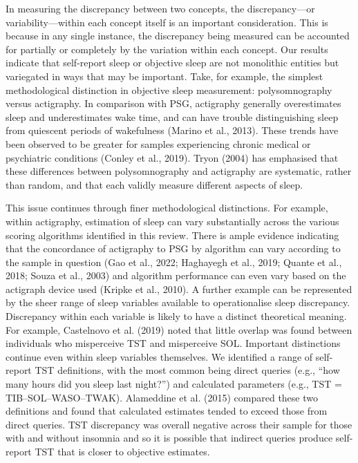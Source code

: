 \documentclass[
]{article}
\begin{document}
In measuring the discrepancy between two concepts, the discrepancy---or variability---within each concept itself is an important consideration. This is because in any single instance, the discrepancy being measured can be accounted for partially or completely by the variation within each concept. Our results indicate that self-report sleep or objective sleep are not monolithic entities but variegated in ways that may be important. Take, for example, the simplest methodological distinction in objective sleep measurement: polysomnography versus actigraphy. In comparison with PSG, actigraphy generally overestimates sleep and underestimates wake time, and can have trouble distinguishing sleep from quiescent periods of wakefulness (Marino et al., 2013). These trends have been observed to be greater for samples experiencing chronic medical or psychiatric conditions (Conley et al., 2019). Tryon (2004) has emphasised that these differences between polysomnography and actigraphy are systematic, rather than random, and that each validly measure different aspects of sleep.

This issue continues through finer methodological distinctions. For example, within actigraphy, estimation of sleep can vary substantially across the various scoring algorithms identified in this review. There is ample evidence indicating that the concordance of actigraphy to PSG by algorithm can vary according to the sample in question (Gao et al., 2022; Haghayegh et al., 2019; Quante et al., 2018; Souza et al., 2003) and algorithm performance can even vary based on the actigraph device used (Kripke et al., 2010). A further example can be represented by the sheer range of sleep variables available to operationalise sleep discrepancy. Discrepancy within each variable is likely to have a distinct theoretical meaning. For example, Castelnovo et al. (2019) noted that little overlap was found between individuals who misperceive TST and misperceive SOL. Important distinctions continue even within sleep variables themselves. We identified a range of self-report TST definitions, with the most common being direct queries (e.g., ``how many hours did you sleep last night?'') and calculated parameters (e.g., TST = TIB--SOL--WASO--TWAK). Alameddine et al. (2015) compared these two definitions and found that calculated estimates tended to exceed those from direct queries. TST discrepancy was overall negative across their sample for those with and without insomnia and so it is possible that indirect queries produce self-report TST that is closer to objective estimates.
\end{document}
